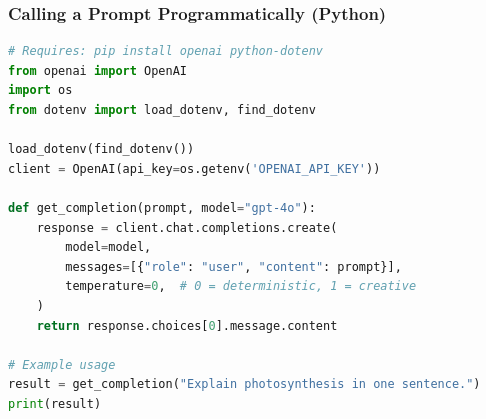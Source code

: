 \begin{frame}[fragile]\frametitle{Calling a Prompt Programmatically (Python)}

\begin{lstlisting}[language=Python]
# Requires: pip install openai python-dotenv
from openai import OpenAI
import os
from dotenv import load_dotenv, find_dotenv

load_dotenv(find_dotenv())
client = OpenAI(api_key=os.getenv('OPENAI_API_KEY'))

def get_completion(prompt, model="gpt-4o"):
    response = client.chat.completions.create(
        model=model,
        messages=[{"role": "user", "content": prompt}],
        temperature=0,  # 0 = deterministic, 1 = creative
    )
    return response.choices[0].message.content

# Example usage
result = get_completion("Explain photosynthesis in one sentence.")
print(result)
\end{lstlisting}

		
\end{frame}


